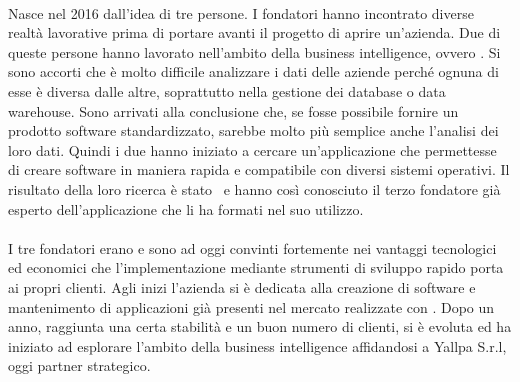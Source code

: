 \paragraph*{}Nasce nel 2016 dall'idea di tre persone. I fondatori hanno incontrato diverse realtà lavorative prima di portare avanti il progetto di aprire un'azienda. Due di queste persone hanno lavorato nell'ambito della business intelligence, ovvero \todo . 
Si sono accorti che è molto difficile analizzare i dati delle aziende perché ognuna di esse è diversa dalle altre, soprattutto nella gestione dei database o data warehouse. Sono arrivati alla conclusione che, se fosse possibile fornire un prodotto software standardizzato, sarebbe molto più semplice anche l'analisi dei loro dati. Quindi i due hanno iniziato a cercare un'applicazione che permettesse di creare software in maniera rapida e compatibile con diversi sistemi operativi. Il risultato della loro ricerca è stato \inde\ e hanno così conosciuto il terzo fondatore già esperto dell'applicazione che li ha formati nel suo utilizzo.
 
\paragraph*{}I tre fondatori erano e sono ad oggi convinti fortemente nei vantaggi tecnologici ed economici che l'implementazione mediante strumenti di sviluppo rapido porta ai propri clienti. Agli inizi l'azienda si è dedicata alla creazione di software e mantenimento di applicazioni già presenti nel mercato realizzate con \inde. Dopo un anno, raggiunta una certa stabilità e un buon numero di clienti, si è evoluta ed ha iniziato ad esplorare l'ambito della business intelligence affidandosi a Yallpa S.r.l, oggi partner strategico. 

 



